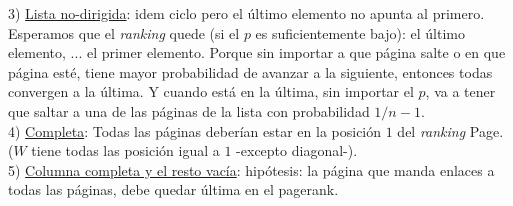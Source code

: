 			3) \underline{Lista no-dirigida}: idem ciclo pero el último elemento no apunta al primero. Esperamos que el \textit{ranking} quede (si el $p$ es suficientemente bajo): el último elemento, ... el primer elemento. Porque sin importar a que página salte o en que página esté, tiene mayor probabilidad de avanzar a la siguiente, entonces todas convergen a la última. Y cuando está en la última, sin importar el $p$, va a tener que saltar a una de las páginas de la lista con probabilidad $1/n-1$.\\

			4) \underline{Completa}: Todas las páginas deberían estar en la posición $1$ del \textit{ranking} Page. ($W$ tiene todas las posición igual a $1$ -excepto diagonal-).\\

			5) \underline{Columna completa y el resto vacía}: hipótesis: la página que manda enlaces a todas las páginas, debe quedar última en el pagerank.


